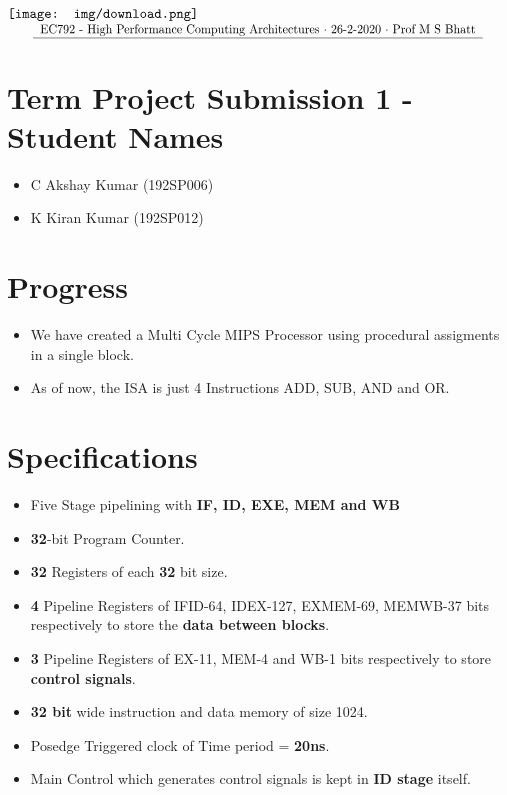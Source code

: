 \documentclass{article}
\begin{document}
\begin{frame}{}
    \centering
    \hspace*{-0.5cm}
    $\vcenter{\hbox{\texttt{[image: img/download.png]}}}$
    $\vcenter{\resizebox{0.95\textwidth}{!}{
        \begin{tabular}{c}
             EC792 - High Performance Computing Architectures $\cdot$ 26-2-2020 $\cdot$ Prof M S Bhatt  \\
             \hline 
        \end{tabular}
    }}$
\end{frame}

\section*{Term Project Submission 1 - Student Names}

\begin{itemize}
    \item C Akshay Kumar (192SP006)
    \item K Kiran Kumar (192SP012)
\end{itemize}

\section*{Progress}

\begin{itemize}
    \item We have created a Multi Cycle MIPS Processor using procedural assigments in a single block.
    \item As of now, the ISA is just 4 Instructions ADD, SUB, AND and OR.
    
\end{itemize}

\section*{Specifications}

\begin{itemize}
    \item Five Stage pipelining with \textbf{IF, ID, EXE, MEM and WB}
    \item \textbf{32}-bit Program Counter.
    \item \textbf{32} Registers of each \textbf{32} bit size.
    \item \textbf{4} Pipeline Registers of IFID-64, IDEX-127, EXMEM-69, MEMWB-37 bits respectively to store the \textbf{data between blocks}.
    \item \textbf{3} Pipeline Registers of EX-11, MEM-4 and WB-1 bits respectively to store \textbf{control signals}.
    \item \textbf{32 bit} wide instruction and data memory of size 1024.
    \item Posedge Triggered clock of Time period = \textbf{20ns}.
    \item Main Control which generates control signals is kept in \textbf{ID stage }itself.
    
\end{itemize}
\end{document}
